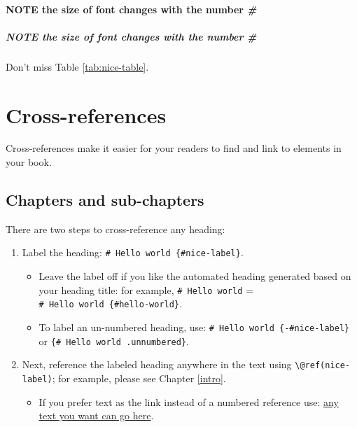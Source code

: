 \documentclass[
]{book}
\providecommand{\tightlist}{%
  \setlength{\itemsep}{0pt}\setlength{\parskip}{0pt}}
\theoremstyle{definition}
\theoremstyle{definition}
\theoremstyle{definition}
\theoremstyle{definition}
\theoremstyle{remark}
\begin{document}
\hypertarget{note-the-size-of-font-changes-with-the-number-2}{%
\subsubsection{\texorpdfstring{NOTE the size of font changes with the number \emph{\#}}{NOTE the size of font changes with the number \#}}\label{note-the-size-of-font-changes-with-the-number-2}}

\hypertarget{note-the-size-of-font-changes-with-the-number-3}{%
\paragraph{\texorpdfstring{NOTE the size of font changes with the number \emph{\#}}{NOTE the size of font changes with the number \#}}\label{note-the-size-of-font-changes-with-the-number-3}}

Don't miss Table \ref{tab:nice-table}.

\hypertarget{cross}{%
\chapter{Cross-references}\label{cross}}

Cross-references make it easier for your readers to find and link to elements in your book.

\hypertarget{chapters-and-sub-chapters}{%
\section{Chapters and sub-chapters}\label{chapters-and-sub-chapters}}

There are two steps to cross-reference any heading:

\begin{enumerate}
\def\labelenumi{\arabic{enumi}.}
\item
  Label the heading: \texttt{\#\ Hello\ world\ \{\#nice-label\}}.

  \begin{itemize}
  \item
    Leave the label off if you like the automated heading generated based on your heading title: for example, \texttt{\#\ Hello\ world} = \texttt{\#\ Hello\ world\ \{\#hello-world\}}.
  \item
    To label an un-numbered heading, use: \texttt{\#\ Hello\ world\ \{-\#nice-label\}} or \texttt{\{\#\ Hello\ world\ .unnumbered\}}.
  \end{itemize}
\item
  Next, reference the labeled heading anywhere in the text using \texttt{\textbackslash{}@ref(nice-label)}; for example, please see Chapter \ref{intro}.

  \begin{itemize}
  \tightlist
  \item
    If you prefer text as the link instead of a numbered reference use: \protect\hyperlink{cross}{any text you want can go here}.
  \end{itemize}
\end{enumerate}
\end{document}
